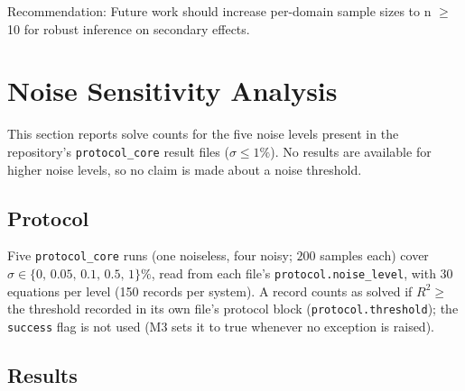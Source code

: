 \documentclass[twoside,11pt]{article}
\newcommand{\Rsq}{R^{2}}
\begin{document}
Recommendation: Future work should increase per-domain sample sizes to n $\geq$ 10 for robust inference on secondary effects.



\section{Noise Sensitivity Analysis}
\label{app:noise_sensitivity}

This section reports solve counts for the five noise levels present in the
repository's \texttt{protocol\_core} result files ($\sigma\leq1\%$). No results are available for higher noise levels, so no claim is made about a noise threshold.

\subsection{Protocol}

Five \texttt{protocol\_core} runs (one noiseless, four noisy; $200$ samples each)
cover $\sigma\in\{0,\,0.05,\,0.1,\,0.5,\,1\}\%$, read from each file's
\texttt{protocol.noise\_level}, with 30 equations per level (150 records per
system). A record counts as solved if $\Rsq\geq$ the threshold recorded in its
own file's protocol block (\texttt{protocol.threshold}); the
\texttt{success} flag is not used (M3 sets it to true whenever no exception is
raised).

\subsection{Results}
\end{document}
